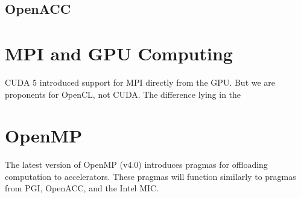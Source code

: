 \documentclass{report}
\begin{document}
\subsection{OpenACC}




\section{MPI and GPU Computing}

CUDA 5 introduced support for MPI directly from the GPU. But we are proponents for OpenCL, not CUDA. The difference lying in the 


\section{OpenMP}
The latest version of OpenMP (v4.0) introduces pragmas for offloading computation to accelerators. These pragmas will function similarly to pragmas from PGI, OpenACC, and the Intel MIC. 


\ifstandalone


\end{document}
